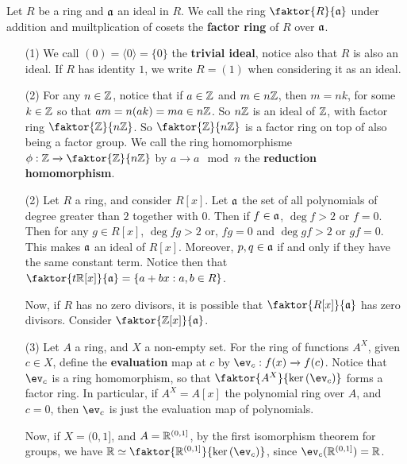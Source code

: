 \begin{definition}
  Let $R$ be a ring and $\mathfrak{a}$ an ideal in $R$. We call the ring
  $\faktor{R}{\af}$
  under addition and muiltplication of cosets the \textbf{factor ring}
  of $R$ over  $\mathfrak{a}$.
\end{definition}

\begin{example}\label{example_5.10}
  \begin{enumerate}
    \item[(1)] We call $(0)=\langle 0 \rangle=\{0\}$ the \textbf{trivial ideal},
      notice also that $R$ is also an ideal. If $R$ has identity $1$,
      we write $R=(1)$ when considering it as an ideal.

    \item[(2)] For any $n \in \mathbb{Z}$, notice that if $a \in \mathbb{Z}$ and $m \in
      n\mathbb{Z}$, then  $m=nk$, for some  $k \in \mathbb{Z}$ so that  $am=n(ak)=ma \in
      n\mathbb{Z}$. So $n\mathbb{Z}$ is an ideal of $\mathbb{Z}$, with factor ring
      $\faktor{\Z}{n\Z}$. So $\faktor{\Z}{n\Z}$ is a factor ring on top of
      also being a factor group. We call the ring homomorphisme $\phi:\Z
      \xrightarrow{} \faktor{\Z}{n\Z}$ by $a \xrightarrow{} a \mod{n}$ the
      \textbf{reduction homomorphism}.

    \item[(2)] Let $R$ a ring, and consider  $R[x]$. Let $\mathfrak{a}$ the set of all
      polynomials of degree greater than $2$ together with $0$. Then if
      $f \in \mathfrak{a}$,  $\deg{f}>2$ or $f=0$. Then for any  $g \in R[x]$,
      $\deg{fg}>2$ or, $fg=0$ and $\deg{gf}>2$ or $gf=0$. This
      makes  $\mathfrak{a}$ an ideal of $R[x]$. Moreover, $p,q \in \mathfrak{a}$ if and
      only if they have the same constant term. Notice then that
      $\faktor{t\R[x]}{\af}=\{a+bx : a,b \in R\}$.

      Now, if $R$ has no zero divisors, it is possible that
      $\faktor{R[x]}{\af}$ has zero divisors. Consider
      $\faktor{\Z[x]}{\af}$.

    \item[(3)] Let $A$ a ring, and  $X$ a non-empty set. For the ring of
      functions $A^X$, given $c \in X$, define the
      \textbf{evaluation} map at $c$ by $\ev_c:f(x) \xrightarrow{} f(c)$.
      Notice that $\ev_c$ is a ring homomorphism, so that
      $\faktor{A^X}{\ker{(\ev_c)}}$ forms a factor ring. In particular, if
      $A^X=A[x]$ the polynomial ring over $A$, and  $c=0$, then $\ev_c$ is
      just the evaluation map of polynomials.

      Now, if  $X=(0,1]$, and $A=\mathbb{R}^{(0,1]}$, by the first isomorphism
      theorem for groups, we have $\R \simeq \faktor{\R^{(0,1]}}{\ker{(\ev_c)}}$,
      since $\ev_c(\R^{(0,1]})=\R$.


\end{enumerate}
\end{example}

